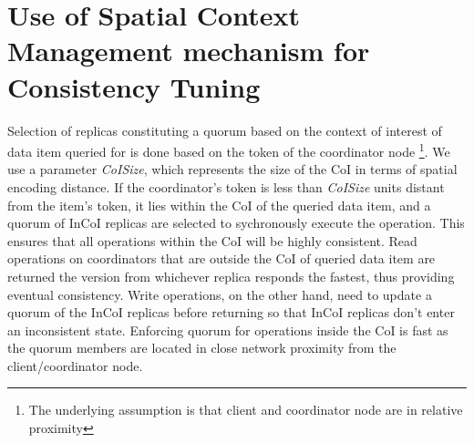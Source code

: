\section{Use of Spatial Context Management mechanism for Consistency Tuning}
\label{sec:consistency_tuning}

Selection of replicas constituting a quorum based on the context of interest of data item queried for is done based on the token of the coordinator node \footnote{The underlying assumption is that client and coordinator node are in relative proximity}. We use a parameter \emph{CoISize}, which represents the size of the CoI in terms of spatial encoding distance.  If the coordinator's token is less than \emph{CoISize} units distant from the item's token, it lies within the CoI of the queried data item, and a quorum of InCoI replicas are selected to sychronously execute the operation. This ensures that all operations within the CoI will be highly consistent. Read operations on coordinators that are outside the CoI of queried data item are returned the version from whichever replica responds the fastest, thus providing eventual consistency. Write operations, on the other hand, need to update a quorum of the InCoI replicas before returning so that InCoI replicas don't enter an inconsistent state. Enforcing quorum for operations inside the CoI is fast as the quorum members are located in close network proximity from the client/coordinator node.

